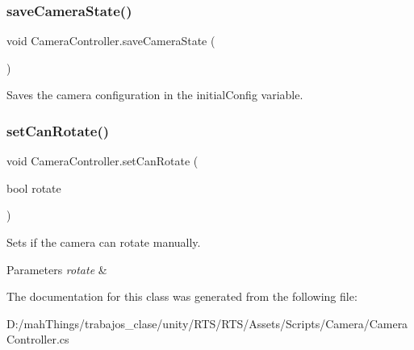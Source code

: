 \subsubsection{\texorpdfstring{save\+Camera\+State()}{saveCameraState()}}
{\footnotesize\ttfamily void Camera\+Controller.\+save\+Camera\+State (\begin{DoxyParamCaption}{ }\end{DoxyParamCaption})}



Saves the camera configuration in the initial\+Config variable. 

\mbox{\label{class_camera_controller_a4b49ea92545c33fcbd37d39004300f6a}} 
\subsubsection{\texorpdfstring{set\+Can\+Rotate()}{setCanRotate()}}
{\footnotesize\ttfamily void Camera\+Controller.\+set\+Can\+Rotate (\begin{DoxyParamCaption}\item[{bool}]{rotate }\end{DoxyParamCaption})}



Sets if the camera can rotate manually. 


\begin{DoxyParams}{Parameters}
{\em rotate} & \\
\hline
\end{DoxyParams}


The documentation for this class was generated from the following file\+:\begin{DoxyCompactItemize}
\item 
D\+:/mah\+Things/trabajos\+\_\+clase/unity/\+R\+T\+S/\+R\+T\+S/\+Assets/\+Scripts/\+Camera/Camera\+Controller.\+cs\end{DoxyCompactItemize}
